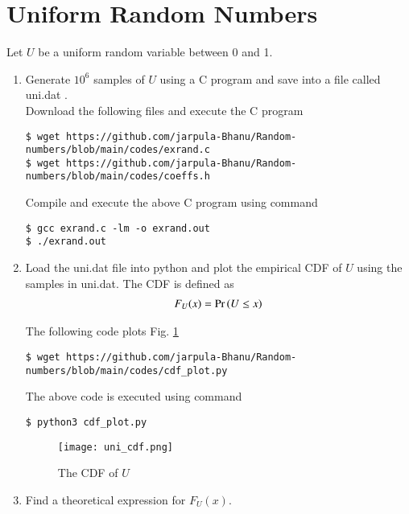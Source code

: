 \documentclass[journal,12pt,twocolumn]{IEEEtran}
\renewcommand\thesection{\arabic{section}}
\begin{document}
\section{Uniform Random Numbers}
Let $U$ be a uniform random variable between 0 and 1.
\begin{enumerate}[label=\thesection.\arabic*
,ref=\thesection.\theenumi]
\item Generate $10^6$ samples of $U$ using a C program and save into a file called uni.dat .\\
\solution
Download the following files and execute the C program
\begin{lstlisting}
$ wget https://github.com/jarpula-Bhanu/Random-numbers/blob/main/codes/exrand.c
$ wget https://github.com/jarpula-Bhanu/Random-numbers/blob/main/codes/coeffs.h
\end{lstlisting}
Compile and execute the above C program using command
\begin{lstlisting}
$ gcc exrand.c -lm -o exrand.out
$ ./exrand.out
\end{lstlisting}

%
\item
Load the uni.dat file into python and plot the empirical CDF of $U$ using the samples in uni.dat. The CDF is defined as
\begin{align}
F_{U}(x) = \Pr\left(U \leq x\right)
\end{align}

\solution  The following code plots Fig. \ref{fig:uni_cdf}
\begin{lstlisting}
$ wget https://github.com/jarpula-Bhanu/Random-numbers/blob/main/codes/cdf_plot.py
\end{lstlisting}
The above code is executed using command
\begin{lstlisting}
$ python3 cdf_plot.py
\end{lstlisting}

\begin{figure}[h]
\centering
\texttt{[image: uni\_cdf.png]}
\caption{The CDF of $U$}
\label{fig:uni_cdf}
\end{figure}

%
\item
Find a theoretical expression for $F_{U}(x)$.


\end{enumerate}
\end{document}
